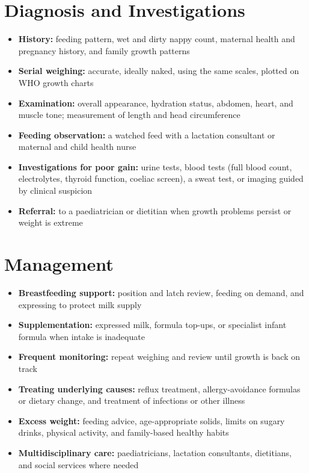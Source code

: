 \section*{Diagnosis and Investigations}
\begin{itemize}
    \item \textbf{History:} feeding pattern, wet and dirty nappy count, maternal health and pregnancy history, and family growth patterns
    \item \textbf{Serial weighing:} accurate, ideally naked, using the same scales, plotted on WHO growth charts
    \item \textbf{Examination:} overall appearance, hydration status, abdomen, heart, and muscle tone; measurement of length and head circumference
    \item \textbf{Feeding observation:} a watched feed with a lactation consultant or maternal and child health nurse
    \item \textbf{Investigations for poor gain:} urine tests, blood tests (full blood count, electrolytes, thyroid function, coeliac screen), a sweat test, or imaging guided by clinical suspicion
    \item \textbf{Referral:} to a paediatrician or dietitian when growth problems persist or weight is extreme
\end{itemize}

\section*{Management}
\begin{itemize}
    \item \textbf{Breastfeeding support:} position and latch review, feeding on demand, and expressing to protect milk supply
    \item \textbf{Supplementation:} expressed milk, formula top-ups, or specialist infant formula when intake is inadequate
    \item \textbf{Frequent monitoring:} repeat weighing and review until growth is back on track
    \item \textbf{Treating underlying causes:} reflux treatment, allergy-avoidance formulas or dietary change, and treatment of infections or other illness
    \item \textbf{Excess weight:} feeding advice, age-appropriate solids, limits on sugary drinks, physical activity, and family-based healthy habits
    \item \textbf{Multidisciplinary care:} paediatricians, lactation consultants, dietitians, and social services where needed
\end{itemize}


